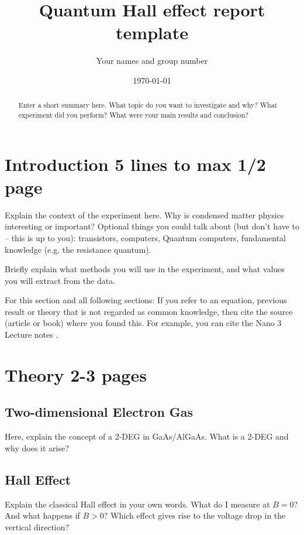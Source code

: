 \documentclass[a4paper]{article}
\title{Quantum Hall effect report template}
\author{Your names and group number}
\date{\today}
\begin{document}
    \maketitle
    
    \begin{abstract}
    Enter a short summary here. What topic do you want to investigate and why? What experiment did you perform? What were your main results and conclusion?
    \end{abstract}
    
    \section{Introduction 5 lines to max 1/2 page}
    \label{sec:introduction}
    
    Explain the context of the experiment here. Why is condensed matter physics interesting or important?
    Optional things you could talk about (but don't have to -- this is up to you): transistors, computers, Quantum computers, fundamental knowledge (e.g. the resistance quantum).
    
    Briefly explain what methods you will use in the experiment, and what values you will extract from the data.
    
    For this section and all following sections: If you refer to an equation, previous result or theory that is not regarded as common knowledge, then cite the source (article or book) where you found this. For example, you can cite the Nano 3 Lecture notes \cite{nano3}.
    
    \section{Theory 2-3 pages}
    \label{sec:theory}
    
    \subsection{Two-dimensional Electron Gas}
    Here, explain the concept of a 2-DEG in GaAs/AlGaAs. What is a 2-DEG and why does it arise?
    
    \subsection{Hall Effect}
    Explain the classical Hall effect in your own words. What do I measure at $B=0$? And what happens if $B>0$? Which effect gives rise to the voltage drop in the vertical direction?
    
\end{document}
